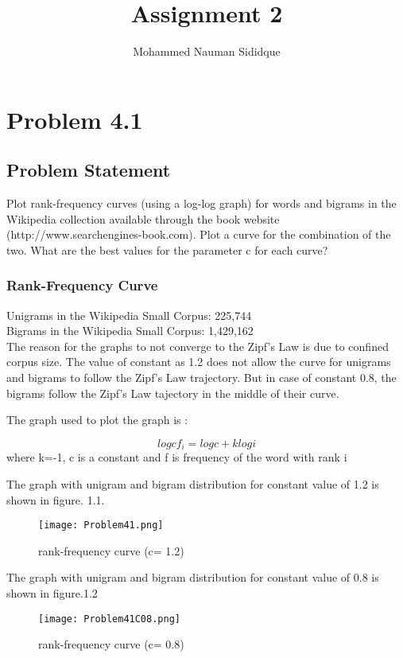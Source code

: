 \documentclass[12pt]{report}
\author{Mohammed Nauman Sididque}
\title{Assignment 2 }
\begin{document}
\maketitle
\tableofcontents
\chapter{Problem 4.1}
\section{Problem Statement}
Plot rank-frequency curves (using a log-log graph) for words and bigrams in the Wikipedia collection available through the book website (http://www.searchengines-book.com). Plot a curve for the combination of the two. What are the best values for the parameter c for each curve?
\subsection{Rank-Frequency Curve}

Unigrams in the Wikipedia Small Corpus: 225,744\\
Bigrams in the Wikipedia Small Corpus: 1,429,162\\

The reason for the graphs to not converge to the Zipf's Law is due to confined corpus size. The value of constant as 1.2 does not allow the curve for unigrams and bigrams to follow the Zipf's Law trajectory. But in case of constant 0.8, the bigrams follow the Zipf's Law tajectory in the middle of their curve.

The graph used to plot the graph is :

\[log cf_i = log c + k log i\] where k=-1, c is a constant and f is frequency of the word with rank i

The graph with unigram and bigram distribution for constant value of 1.2 is shown in figure. 1.1.  

\begin{figure}[ht] 
  \centering
  \texttt{[image: Problem41.png]}
  \caption{ rank-frequency curve (c= 1.2)}
  \label{fig:1}
\end{figure}

The graph with unigram and bigram distribution for constant value of 0.8 is shown in figure.1.2
 
\begin{figure}[ht] 
  \centering
  \texttt{[image: Problem41C08.png]}
  \caption{ rank-frequency curve (c= 0.8)}
  \label{fig:2}
\end{figure}
\end{document}
